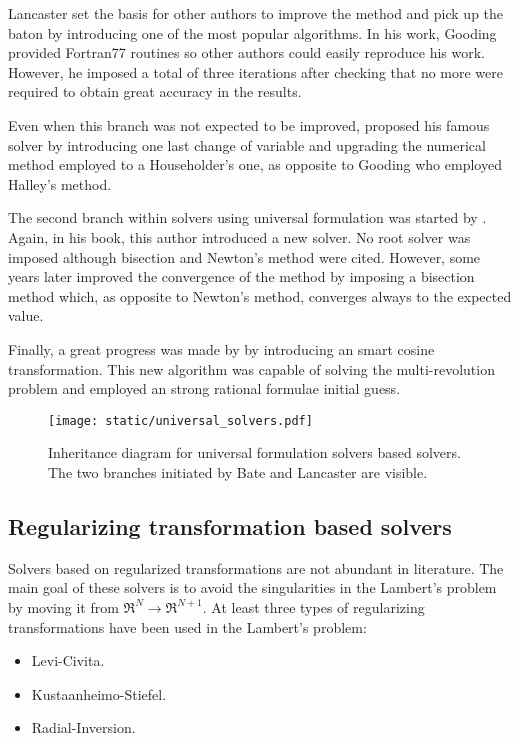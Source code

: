 Lancaster set the basis for other authors to improve the method and
\cite{gooding1990} pick up the baton by introducing one of the most popular
algorithms. In his work, Gooding provided Fortran77 routines so other authors
could easily reproduce his work. However, he imposed a total of three iterations
after checking that no more were required to obtain great accuracy in the
results.

Even when this branch was not expected to be improved, \cite{izzo2015} proposed
his famous solver by introducing one last change of variable and upgrading the
numerical method employed to a Householder's one, as opposite to Gooding who
employed Halley's method.

The second branch within solvers using universal formulation was started by
\cite{bate1971}. Again, in his book, this author introduced a new solver.
No root solver was imposed although bisection and Newton's method were cited.
However, some years later \cite{vallado2013} improved the convergence of the
method by imposing a bisection method which, as opposite to Newton's method,
converges always to the expected value.

Finally, a great progress was made by \cite{arora2013} by introducing an smart
cosine transformation. This new algorithm was capable of solving the
multi-revolution problem and employed an strong rational formulae initial guess.

\vspace{0.5cm}
\begin{figure}[h]
  \centering
  \texttt{[image: static/universal\_solvers.pdf]}
  \caption[Universal formulae based solvers]{Inheritance diagram for universal formulation solvers based solvers.
    The two branches initiated by Bate and Lancaster are visible.}
  \label{fig:universal_solvers}
\end{figure}


\subsection{Regularizing transformation based solvers}

Solvers based on regularized transformations are not abundant in literature. The
main goal of these solvers is to avoid the singularities in the Lambert's
problem by moving it from $\Re^{N} \rightarrow \Re^{N+1}$. At least three types
of regularizing transformations have been used in the Lambert's problem:

\begin{itemize}
  \item Levi-Civita.
  \item Kustaanheimo-Stiefel.
  \item Radial-Inversion.
\end{itemize}

